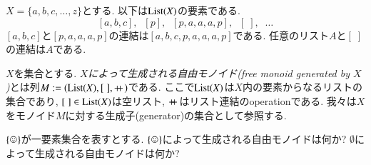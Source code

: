 \begin{example}


$X=\{a,b,c,\ldots,z\}$とする. 以下は$\List(X)$の要素である. $$[a,b,c],\;\; [p],\;\; [p,a,a,a,p],\;\; [\;],\;\;\dots$$ $[a,b,c]$と$[p,a,a,a,p]$の連結は$[a,b,c,p,a,a,a,p]$である. 任意のリスト$A$と$[\;]$の連結は$A$である.

\end{example}

\begin{definition}\label{def:free monoid}


$X$を集合とする. \emph{$X$によって生成される自由モノイド(free monoid generated by $X$)}とは列$M:=(\List(X),[\;],\plpl)$である. ここで$\List(X)$は$X$内の要素からなるリストの集合であり, $[\;]\in\List(X)$は空リスト, $+\!\!+\hspace{1pt}$はリスト連結のoperationである. 我々は$X$をモノイド$M$に対する生成子(generator)の集合として参照する.

\end{definition}

\begin{exercise}
$\singleton$が一要素集合を表すとする.
\sexc $\singleton$によって生成される自由モノイドは何か?
\next $\emptyset$によって生成される自由モノイドは何か?
\endsexc
\end{exercise}


